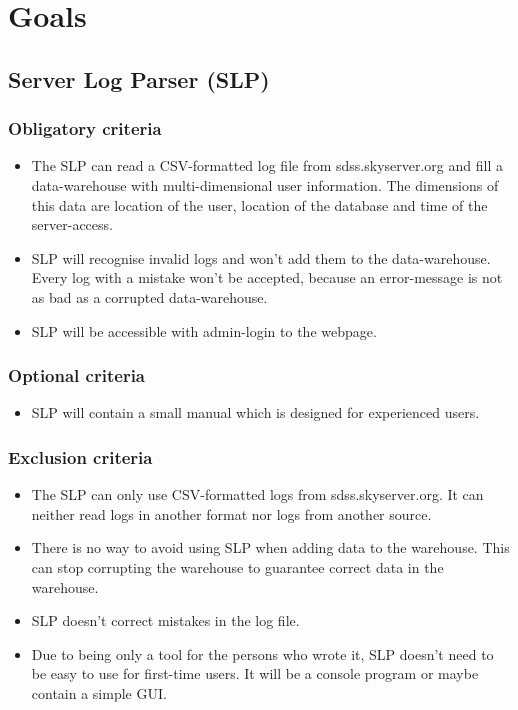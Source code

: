 \section{Goals}


\subsection{Server Log Parser (SLP)}


\subsubsection{Obligatory criteria} %
\begin{itemize}
\item The SLP can read a CSV-formatted log file from sdss.skyserver.org
 and fill a data-warehouse with multi-dimensional user information.
 The dimensions of this data are location of the user, location of the 
 database and time of the server-access. 
\item SLP will recognise invalid logs and won't add them to the data-warehouse.
 Every log with a mistake won't be accepted, because an error-message is not 
 as bad as a corrupted data-warehouse. 
\item SLP will be accessible with admin-login to the webpage.
\end{itemize}

\subsubsection{Optional criteria}
\begin{itemize}
\item SLP will contain a small manual which is designed for experienced users.
\end{itemize}

\subsubsection{Exclusion criteria}
\begin{itemize}
\item The SLP can only use CSV-formatted logs from sdss.skyserver.org. 
It can neither read logs in another format nor logs
from another source.
\item There is no way to avoid using SLP when adding data to the warehouse. 
This can stop corrupting the warehouse to guarantee correct data in the warehouse.
\item SLP doesn't correct mistakes in the log file.
\item Due to being only a tool for the persons who wrote it, SLP doesn't need to be easy to use for first-time users.
It will be a console program or maybe contain a simple GUI.
\end{itemize}



